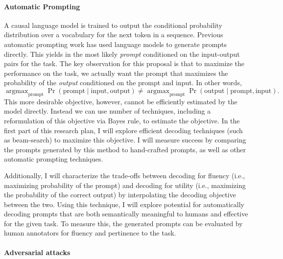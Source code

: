 \documentclass[11pt]{article}
\newcommand{\argmax}{\mathop{\mathrm{argmax}}}
\begin{document}
\paragraph{Automatic Prompting}

A causal language model is trained to output the conditional probability 
distribution over a vocabulary for the next token in a sequence.
Previous automatic prompting work 
has used language models to generate prompts directly. 
This yields in the most likely \emph{prompt} conditioned on the input-output pairs for the task.
The key observation for this proposal 
is that to maximize the performance on the task,
we actually want the prompt
that maximizes the probability of the \emph{output} 
conditioned on the prompt and input.
In other words,
\begin{equation}
\argmax_\text{prompt}\Pr(\text{prompt}\mid\text{input},\text{output})
  \neq\argmax_\text{prompt}\Pr(\text{output}\mid\text{prompt},\text{input}).
\end{equation}
This more desirable objective, however, 
cannot be efficiently estimated by the model directly.
Instead we can use number of techniques, 
including a reformulation of this objective via Bayes rule,
to estimate the objective. 
In the first part of this research plan, 
I will explore efficient decoding techniques (such as beam-search) to maximize this objective.
I will measure success by comparing the prompts generated by this method
to hand-crafted prompts, as well as other automatic prompting techniques.

Additionally, I will characterize the trade-offs between decoding for fluency 
(i.e., maximizing probability of the prompt)
and decoding for utility 
(i.e., maximizing the probability of the correct output)
by interpolating the decoding objective between the two.
Using this technique, I will explore potential 
for automatically decoding prompts 
that are both semantically meaningful to humans 
and effective for the given task.
To measure this, the generated prompts can be evaluated by 
human annotators for fluency and pertinence to the task.

\paragraph{Adversarial attacks} 
\end{document}
